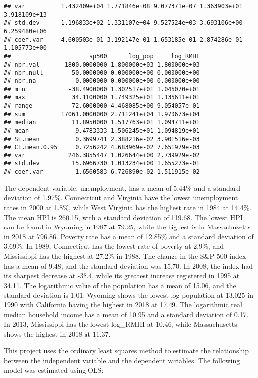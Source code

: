 \documentclass[
]{article}
\begin{document}
\begin{verbatim}
## var          1.432409e+04 1.771846e+08 9.077371e+07 1.363903e+01 3.918109e+13
## std.dev      1.196833e+02 1.331107e+04 9.527524e+03 3.693106e+00 6.259480e+06
## coef.var     4.600503e-01 3.192147e-01 1.653185e-01 2.874286e-01 1.105773e+00
##                      sp500      log_pop     log_RMHI
## nbr.val       1800.0000000 1.800000e+03 1.800000e+03
## nbr.null        50.0000000 0.000000e+00 0.000000e+00
## nbr.na           0.0000000 0.000000e+00 0.000000e+00
## min            -38.4900000 1.302517e+01 1.046070e+01
## max             34.1100000 1.749325e+01 1.136611e+01
## range           72.6000000 4.468085e+00 9.054057e-01
## sum          17061.0000000 2.711241e+04 1.970673e+04
## median          11.8950000 1.517763e+01 1.094711e+01
## mean             9.4783333 1.506245e+01 1.094819e+01
## SE.mean          0.3699741 2.388216e-02 3.901516e-03
## CI.mean.0.95     0.7256242 4.683969e-02 7.651979e-03
## var            246.3855447 1.026644e+00 2.739929e-02
## std.dev         15.6966730 1.013234e+00 1.655273e-01
## coef.var         1.6560583 6.726890e-02 1.511915e-02
\end{verbatim}

The dependent variable, unemployment, has a mean of 5.44\% and a
standard deviation of 1.97\%. Connecticut and Virginia have the lowest
unemployment rates in 2000 at 1.8\%, while West Virginia has the highest
rate in 1984 at 14.4\%. The mean HPI is 260.15, with a standard
deviation of 119.68. The lowest HPI can be found in Wyoming in 1987 at
79.25, while the highest is in Massachusetts in 2018 at 796.86. Poverty
rate has a mean of 12.85\% and a standard deviation of 3.69\%. In 1989,
Connecticut has the lowest rate of poverty at 2.9\%, and Mississippi has
the highest at 27.2\% in 1988. The change in the S\&P 500 index has a
mean of 9.48, and the standard deviation was 15.70. In 2008, the index
had its sharpest decrease at -38.4, while its greatest increase
registered in 1995 at 34.11. The logarithmic value of the population has
a mean of 15.06, and the standard deviation is 1.01. Wyoming shows the
lowest log population at 13.025 in 1990 with California having the
highest in 2018 at 17.49. The logarithmic real median household income
has a mean of 10.95 and a standard deviation of 0.17. In 2013,
Mississippi has the lowest log\_RMHI at 10.46, while Massachusetts shows
the highest in 2018 at 11.37.

This project uses the ordinary least squares method to estimate the
relationship between the independent variable and the dependent
variables. The following model was estimated using OLS:
\end{document}
